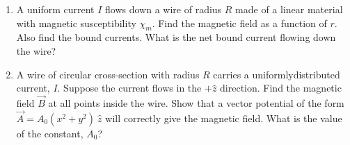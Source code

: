\documentclass[fleqn]{article}
\begin{document}
\begin{enumerate}
    \item A uniform current $I$ flows down a wire of radius $R$ made of a linear material with magnetic susceptibility $\chi_m$. Find the 
    magnetic field as a function of $r$. Also find the bound currents. What is the net bound current flowing down the wire?


    \item A wire of circular cross-section with radius $R$ carries a uniformlydistributed current, $I$. Suppose the current flows in the $+\hat{z}$ direction.
    Find the magnetic field $\overrightarrow{B}$ at all points inside the wire. Show that a vector potential of the form 
    $\overrightarrow{A}=A_0 \left(x^2+y^2\right) ~ \hat{z}$ will correctly give the
    magnetic field. What is the value of the constant, $A_0$?

    
  \end{enumerate}
\end{document}
